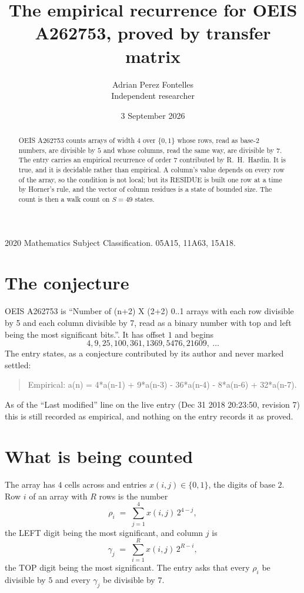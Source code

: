 \documentclass[11pt,a4paper]{article}
\title{The empirical recurrence for OEIS A262753, proved by transfer matrix}
\author{Adrian Perez Fontelles\\ \small Independent researcher}
\date{3 September 2026}
\theoremstyle{plain}
\theoremstyle{definition}
\begin{document}
\maketitle

\begin{abstract}
OEIS A262753 counts arrays of width $4$ over $\{0,1\}$ whose rows, read as base-$2$
numbers, are divisible by $5$ and whose columns, read the same way, are divisible by
$7$. The entry carries an empirical recurrence of order $7$ contributed by
R.~H.~Hardin. It is true, and it is decidable rather than empirical. A column's value depends on
every row of the array, so the condition is not local; but its RESIDUE is built one row at a
time by Horner's rule, and the vector of column residues is a state of bounded size. The count
is then a walk count on $S=49$ states.
\end{abstract}

\noindent\small 2020 Mathematics Subject Classification. 05A15, 11A63, 15A18.\normalsize

\section{The conjecture}

OEIS A262753 is ``Number of (n+2) X (2+2) 0..1 arrays with each row divisible by 5 and each column divisible by 7, read as a binary number with top and left being the most significant bits.''. It has offset $1$ and begins
\[
4, 9, 25, 100, 361, 1369, 5476, 21609,\ \dots
\]
The entry states, as a conjecture contributed by its author and never marked settled:
\begin{quote}
Empirical: a(n) = 4*a(n-1) + 9*a(n-3) - 36*a(n-4) - 8*a(n-6) + 32*a(n-7).
\end{quote}
As of the ``Last modified'' line on the live entry (Dec 31 2018 20:23:50, revision 7) this is still
recorded as empirical, and nothing on the entry records it as proved.

\section{What is being counted}

The array has $4$ cells across and entries $x(i,j)\in\{0,1\}$, the digits of
base $2$. Row $i$ of an array with $R$ rows is the number
\[
\rho_i\;=\;\sum_{j=1}^{4}x(i,j)\,2^{4-j} ,
\]
the LEFT digit being the most significant, and column $j$ is
\[
\gamma_j\;=\;\sum_{i=1}^{R}x(i,j)\,2^{R-i} ,
\]
the TOP digit being the most significant. The entry asks that every $\rho_i$ be divisible by
$5$ and every $\gamma_j$ be divisible by $7$.
\end{document}
